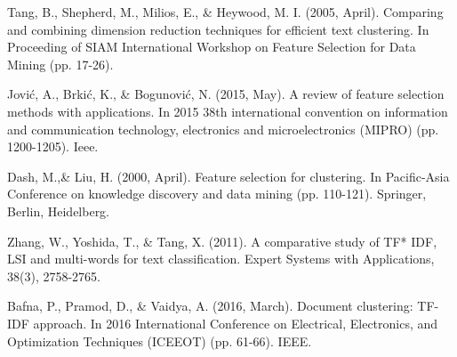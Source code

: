 \documentclass[10pt, a4paper]{article}
\begin{document}
\begin{thebibliography}{X}
 Tang, B., Shepherd, M., Milios, E., \& Heywood, M. I. (2005, April). Comparing and combining dimension reduction techniques for efficient text clustering. In Proceeding of SIAM International Workshop on Feature Selection for Data Mining (pp. 17-26).

 Jović, A., Brkić, K., \& Bogunović, N. (2015, May). A review of feature selection methods with applications. In 2015 38th international convention on information and communication technology, electronics and microelectronics (MIPRO) (pp. 1200-1205). Ieee.

 Dash, M.,\& Liu, H. (2000, April). Feature selection for clustering. In Pacific-Asia Conference on knowledge discovery and data mining (pp. 110-121). Springer, Berlin, Heidelberg.

 Zhang, W., Yoshida, T., \& Tang, X. (2011). A comparative study of TF* IDF, LSI and multi-words for text classification. Expert Systems with Applications, 38(3), 2758-2765.

 Bafna, P., Pramod, D.,  \& Vaidya, A. (2016, March). Document clustering: TF-IDF approach. In 2016 International Conference on Electrical, Electronics, and Optimization Techniques (ICEEOT) (pp. 61-66). IEEE.

 

\end{thebibliography}    
    
\clearpage

    
  
\end{document}

